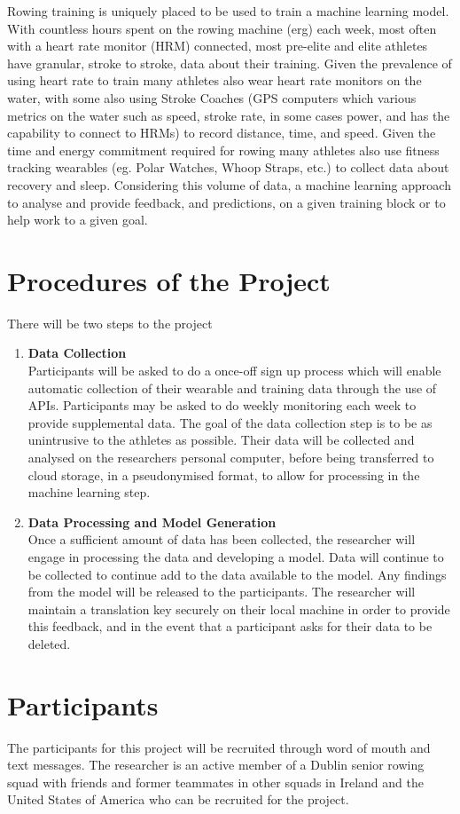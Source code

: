 Rowing training is uniquely placed to be used to train a machine learning model. With countless hours spent on the rowing machine (erg) each week, most often with a heart rate monitor (HRM) connected, most pre-elite and elite athletes have granular, stroke to stroke, data about their training. Given the prevalence of using heart rate to train many athletes also wear heart rate monitors on the water, with some also using Stroke Coaches (GPS computers which various metrics on the water such as speed, stroke rate, in some cases power, and has the capability to connect to HRMs) to record distance, time, and speed. Given the time and energy commitment required for rowing many athletes also use fitness tracking wearables (eg. Polar Watches, Whoop Straps, etc.) to collect data about recovery and sleep. Considering this volume of data, a machine learning approach to analyse and provide feedback, and predictions, on a given training block or to help work to a given goal.
\section*{Procedures of the Project}
There will be two steps to the project
\begin{enumerate}
    \item \textbf{Data Collection}\\Participants will be asked to do a once-off sign up process which will enable automatic collection of their wearable and training data through the use of APIs. Participants may be asked to do weekly monitoring each week to provide supplemental data. The goal of the data collection step is to be as unintrusive to the athletes as possible. Their data will be collected and analysed on the researchers personal computer, before being transferred to cloud storage, in a pseudonymised format, to allow for processing in the machine learning step.
    \item \textbf{Data Processing and Model Generation}\\Once a sufficient amount of data has been collected, the researcher will engage in processing the data and developing a model. Data will continue to be collected to continue add to the data available to the model. Any findings from the model will be released to the participants. The researcher will maintain a translation key securely on their local machine in order to provide this feedback, and in the event that a participant asks for their data to be deleted.
\end{enumerate}
\section*{Participants}
The participants for this project will be recruited through word of mouth and text messages. The researcher is an active member of a Dublin senior rowing squad with friends and former teammates in other squads in Ireland and the United States of America who can be recruited for the project.  

